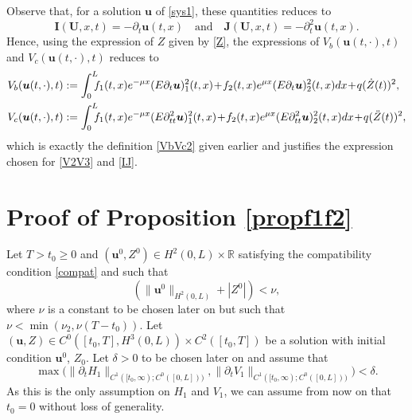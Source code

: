 \documentclass[JEP,XML,SOM,Unicode]{cedram}
\theoremstyle{definition}
\begin{document}
Observe that{, for a solution $\boldsymbol{u}$ of \eqref{sys1}, these quantities reduces to
\[
\boldsymbol{I}(\boldsymbol{U},x,t)=-\partial_{t}\boldsymbol{u}(t,x)\quad\text{and}\quad\boldsymbol{J}(\boldsymbol{U},x,t)=-\partial_{t}^{2}\boldsymbol{u}(t,x).
\]
Hence, using the expression of $Z$ given by \eqref{Z}, the expressions of $V_{b}(\boldsymbol{u}(t,\cdot),t)$ and $V_{c}(\boldsymbol{u}(t,\cdot),t)$ reduces to}
\begin{align*}
V_{b}(\boldsymbol{u}(t,\cdot),t)&:=\int_{0}^{L}\hspace*{-2mm}f_{1}(t,x)e^{-\mu x}(E\partial_{t}\boldsymbol{u})_{1}^{2}(t,x)\!+\!f_{2}(t,x)e^{\mu x}(E\partial_{t}\boldsymbol{u})_{2}^{2}(t,x)dx\!+\!q(\dot Z(t))^{2},\\
V_{c}(\boldsymbol{u}(t,\cdot),t)&:=\int_{0}^{L}\hspace*{-2mm}f_{1}(t,x)e^{-\mu x}(E\partial_{tt}^{2}\boldsymbol{u})_{1}^{2}(t,x)\!+\!f_{2}(t,x)e^{\mu x}(E\partial_{tt}^{2}\boldsymbol{u})_{2}^{2}(t,x)dx\!+\!q(\ddot Z(t))^{2},
\end{align*}
{which is exactly the definition \eqref{VbVc2} given earlier and} justifies the expression chosen for \eqref{V2V3} and \eqref{IJ}.

\section{Proof of Proposition \ref{propf1f2}}
\label{sec:propf1f2}
Let $T>{t_{0}\geq0}$ and $(\boldsymbol{u}^{0},Z^{0})\in H^{2}(0,L)\times\mathbb{R}$ satisfying the compatibility condition \eqref{compat} and such that
\begin{equation*}
\left(\lVert \boldsymbol{u}^{0}\rVert_{H^{2}(0,L)}+|Z^{0}|\right)<\nu,
\end{equation*}
where $\nu$ is a constant to be chosen later on but such that $\nu<\min(\nu_{2},\nu({T-t_{0}}))$.
Let $(\boldsymbol{u},Z)\in C^{0}([{t_{0}},T],H^{3}(0,L))\times C^{2}([t_{0},T])$ be a solution with initial condition $\boldsymbol{u}^{0}$, $Z_{0}$.
Let $\delta>0$ to be chosen later on and assume that
\begin{equation*}
\max\bigl(\lVert\partial_{t}H_{1}\rVert_{C^{1}([t_{0},\infty);{C^{0}([0,L])})},\lVert\partial_{t}V_{1}\rVert_{C^{1}([t_{0},\infty);{C^{0}([0,L])})}\bigr)<\delta.
\end{equation*}
{As this is the only assumption on $H_{1}$ and $V_{1}$, we can assume from now on that $t_{0}=0$ without loss of generality.}
\end{document}
